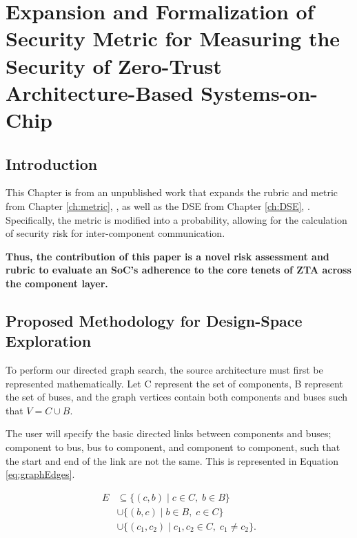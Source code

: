 \label{ch:metricexpanded}\chapter{Expansion and Formalization of Security Metric for Measuring the Security of Zero-Trust Architecture-Based Systems-on-Chip} 
\section{Introduction}
This Chapter is from an unpublished work that expands the rubric and metric from Chapter \ref{ch:metric}, \cite{butka_measuring_2025}, as well as the DSE from Chapter \ref{ch:DSE}, \cite{butka_system-level_2026}. Specifically, the metric is modified into a probability, allowing for the calculation of security risk for inter-component communication. 

\textbf{Thus, the contribution of this paper is a novel risk assessment and rubric to evaluate an SoC's adherence to the core tenets of ZTA across the component layer.}

\section{Proposed Methodology for Design-Space Exploration}
\label{sec:completedwork:ASP}

To perform our directed graph search, the source architecture must first be represented mathematically. Let C represent the set of components, B represent the set of buses, and the graph vertices contain both components and buses such that $V = C \cup B$.

The user will specify the basic directed links between components and buses; component to bus, bus to component, and component to component, such that the start and end of the link are not the same. This is represented in Equation \ref{eq:graphEdges}.

\begin{equation}
    \label{eq:graphEdges}
    \begin{aligned}
        E &\subseteq {}
          \{(c,b) \mid c \in C,\; b \in B\} \\
        & \cup \{(b,c) \mid b \in B,\; c \in C\} \\
        & \cup \{(c_1,c_2) \mid c_1,c_2 \in C,\; c_1 \neq c_2\}.
    \end{aligned}
\end{equation}

